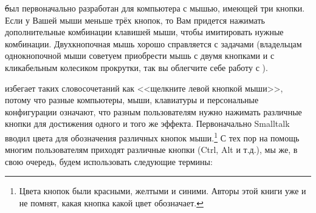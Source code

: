 \documentclass[a4paper,10pt,twoside]{book}
\begin{document}

\st был первоначально разработан для компьютера с мышью,
имеющей три кнопки. Если у Вашей мыши меньше трёх кнопок,
то Вам придется нажимать дополнительные комбинации клавишей мыши,
чтобы имитировать нужные комбинации. Двухкнопочная мышь
хорошо справляется с задачами \pharo (владельцам однокнопочной
мыши советуем приобрести мышь с двумя кнопками и с кликабельным
колесиком прокрутки, так вы облегчите себе работу с \pharo).


\pharo избегает таких словосочетаний как <<щелкните левой кнопкой
мыши>>, потому что разные компьютеры, мыши, клавиатуры и
персональные конфигурации означают, что разным пользователям нужно
нажимать различные кнопки для достижения одного и
того же эффекта.
Первоначально Smalltalk вводил цвета для обозначения различных кнопок
мыши.\footnote{Цвета кнопок были красными, желтыми и синими.
Авторы этой
книги уже и  не помнят, какая кнопка какой цвет обозначает.}
  
С тех пор на помощь многим пользователям приходят различные кнопки
(Ctrl, Alt и т.д.), мы же,  в свою
очередь, будем использовать следующие термины: 
\end{document}
